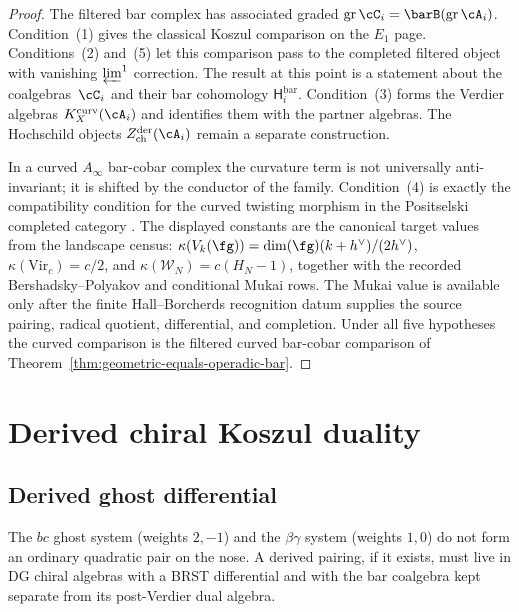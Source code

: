\begin{proof}
The filtered bar complex has associated graded
$\mathrm{gr}\,\cC_i=\barB(\mathrm{gr}\,\cA_i)$. Condition~(1) gives the
classical Koszul comparison on the $E_1$ page. Conditions~(2) and~(5)
let this comparison pass to the completed filtered object with
vanishing $\varprojlim^1$ correction. The result at this point is a
statement about the coalgebras~$\cC_i$ and their bar cohomology
$\mathsf H_i^{\mathrm{bar}}$.  Condition~(3) forms the Verdier
algebras $K_X^{\mathrm{curv}}(\cA_i)$ and identifies them with the
partner algebras.  The Hochschild objects
$Z^{\mathrm{der}}_{\mathrm{ch}}(\cA_i)$ remain a separate construction.

In a curved $A_\infty$ bar-cobar complex the curvature term is not
universally anti-invariant; it is shifted by the conductor of the
family. Condition~(4) is exactly the compatibility condition for the
curved twisting morphism in the Positselski completed category
\cite{Positselski11}. The displayed constants are the canonical target
values from the landscape census:
$\kappa(V_k(\fg))=\dim(\fg)(k+h^\vee)/(2h^\vee)$,
$\kappa(\mathrm{Vir}_c)=c/2$, and
$\kappa(\mathcal W_N)=c(H_N-1)$, together with the recorded
Bershadsky--Polyakov and conditional Mukai rows. The Mukai value is
available only after the finite Hall--Borcherds recognition datum
supplies the source pairing, radical quotient, differential, and
completion. Under all five hypotheses the curved comparison is the
filtered curved bar-cobar comparison of
Theorem~\ref{thm:geometric-equals-operadic-bar}.
\end{proof}


\section{Derived chiral Koszul duality}

\subsection{Derived ghost differential}

The $bc$ ghost system (weights $2,-1$) and the $\beta\gamma$ system
(weights $1,0$) do not form an ordinary quadratic pair on the nose. A
derived pairing, if it exists, must live in DG chiral algebras with a
BRST differential and with the bar coalgebra kept separate from its
post-Verdier dual algebra.

